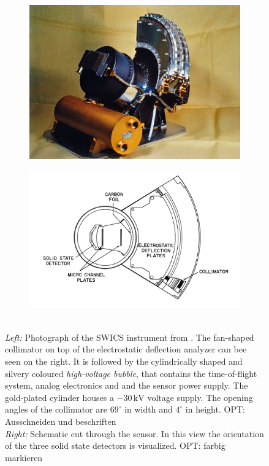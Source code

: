 \begin{figure}
	\centering
	\begin{subfigure}{.5\textwidth}
		\centering
		\includegraphics[width=0.9\linewidth]{Figures/ULYSSES-SWICS.jpg}
	\end{subfigure}%
	\begin{subfigure}{.5\textwidth}
		\centering
		\includegraphics[width=1.1\linewidth]{Figures/swics_sensor.pdf}
	\end{subfigure}
	\caption{\\ \textit{Left:} Photograph of the SWICS instrument from \citet{gloeckler_1992}. The fan-shaped collimator on top of the electrostatic deflection analyzer can bee seen on the right. It is followed by the cylindrically shaped and silvery coloured \textit{high-voltage bubble}, that contains the time-of-flight system, analog electronics and and the sensor power supply. The gold-plated cylinder houses a $-30\,\mathrm{kV}$ voltage supply. The opening angles of the collimator are $69^\circ$ in width and $4^\circ$ in height. OPT: Ausschneiden und beschriften \\ \textit{Right:} Schematic cut through the sensor. In this view the orientation of the three solid state detectors is visualized. OPT: farbig markieren}
	\label{fig:swics}
\end{figure}

